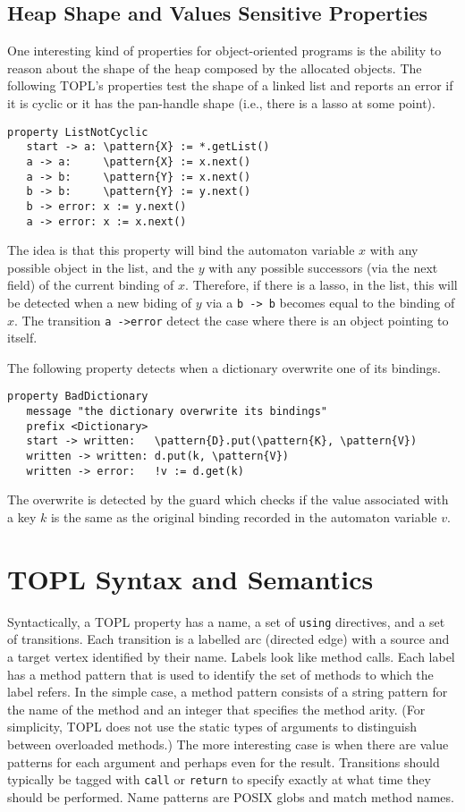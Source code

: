 \documentclass{sigplanconf}[10pt] %
\newcommand{\delimitVerbatim}{\par\nobreak\smallskip\noindent}
\newcommand{\pattern}[1]{\ensuremath{\mathtt{\underline{#1}}}}
\begin{document}
\subsection{Heap Shape and Values Sensitive Properties}  %
One interesting kind of properties for object-oriented programs is the ability to reason about the shape of the heap composed by the allocated objects.
The following TOPL's properties test the shape of a linked list and reports an error if it is cyclic or it has the pan-handle shape (i.e., there is a lasso at some point).
%
\delimitVerbatim
\begin{Verbatim}[commandchars=\\\{\}]
property ListNotCyclic
   start -> a: \pattern{X} := *.getList()
   a -> a:     \pattern{X} := x.next()
   a -> b:     \pattern{Y} := x.next()
   b -> b:     \pattern{Y} := y.next()
   b -> error: x := y.next()
   a -> error: x := x.next()
\end{Verbatim}
\delimitVerbatim
The idea is that this property will bind the automaton variable $x$ with any possible object in the list, and the $y$ with any possible successors (via the next field) of the current binding of $x$.
Therefore, if there is a lasso, in the list, this will be detected when a new biding of $y$ via a \texttt{b -> b} becomes equal to the binding of $x$.
The transition \texttt{a ->error} detect the case where there is an object pointing to itself.


The following property detects when a dictionary overwrite one of its bindings.
\delimitVerbatim
\begin{Verbatim}[commandchars=\\\{\}]
 property BadDictionary
   message "the dictionary overwrite its bindings"
   prefix <Dictionary>
   start -> written:   \pattern{D}.put(\pattern{K}, \pattern{V})
   written -> written: d.put(k, \pattern{V})
   written -> error:   !v := d.get(k)
\end{Verbatim}
\delimitVerbatim
The overwrite is detected by the guard which checks if the value associated with a key $k$ is the same as the original binding recorded in the automaton variable $v$.

\section{TOPL Syntax and Semantics} %
\label{sec:syntax}
Syntactically, a TOPL property has a name, a set of \texttt{using} directives, and a set of transitions.
Each transition is a labelled arc (directed edge) with a source and a target vertex identified by their name.
Labels look like method calls.
Each label has a method pattern that is used to identify the set of methods to which the label refers.
In the simple case, a method pattern consists of a string pattern for the name of the method and an integer that specifies the method arity.
(For simplicity, TOPL does not use the static types of arguments to distinguish between overloaded methods.)
The more interesting case is when there are value patterns for each argument and perhaps even for the result.
Transitions should typically be tagged with \texttt{call} or \texttt{return} to specify exactly at what time they should be performed.
Name patterns are POSIX globs and match method names.
\end{document}
